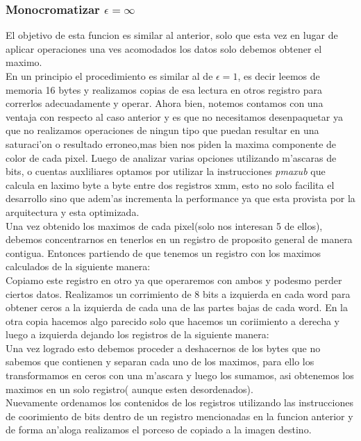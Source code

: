 \subsubsection{Monocromatizar $\epsilon = \infty $ }
El objetivo de esta funcion es similar al anterior, solo que esta vez en lugar de aplicar operaciones
una ves acomodados los datos solo debemos obtener el maximo.\\
En un principio el procedimiento es similar al de  $\epsilon= 1$, es decir leemos de memoria 16 bytes
y realizamos copias de esa lectura en otros registro para correrlos adecuadamente y operar. Ahora bien, 
notemos contamos con una ventaja con respecto al caso anterior y es que no necesitamos desenpaquetar
ya que no realizamos operaciones de ningun tipo que puedan resultar en una saturaci'on o 
resultado erroneo,mas bien nos piden la maxima componente de color de cada pixel. Luego de analizar 
varias opciones utilizando m'ascaras de bits, o cuentas auxliliares optamos por utilizar la instrucciones
\textit{pmaxub} que calcula en laximo byte a byte entre dos registros xmm, esto no solo facilita 
el desarrollo sino que adem'as incrementa la performance ya que esta provista por la arquitectura y 
esta optimizada.\\
Una vez obtenido los maximos  de cada pixel(solo nos interesan 5 de ellos), debemos concentrarnos en
tenerlos en un registro de proposito general de manera contigua. 
Entonces partiendo de que tenemos un registro con los maximos calculados de la siguiente manera:
\\
Copiamo este registro en otro ya que operaremos con ambos y podesmo perder ciertos datos. Realizamos un 
corrimiento de 8 bits a izquierda en cada word para obtener ceros a la izquierda de cada una de las partes bajas de
cada word. En la otra copia hacemos algo parecido solo que hacemos un coriimiento a derecha y luego a izquierda
dejando los registros de la siguiente manera: \\
Una vez logrado esto debemos proceder a deshacernos de los bytes que no sabemos que contienen y separan
cada uno de los maximos, para ello los transformamos en ceros con una m'ascara y luego los sumamos,
asi obtenemos los maximos en un solo registro( aunque esten desordenados).\\
Nuevamente ordenamos los contenidos de los registros utilizando las instrucciones de coorimiento de bits
dentro de un registro mencionadas en la funcion anterior y de forma an'aloga realizamos el porceso de copiado a la imagen destino.






 
 

